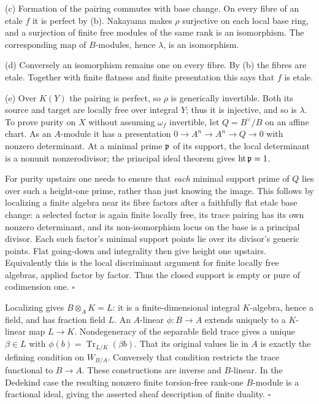 \documentclass[11pt]{article}
\let\chapterexercise\exercise
\renewcommand{\exercise}[2]{\Needspace{8\baselineskip}\chapterexercise{#1}{#2}}
\begin{document}
(c) Formation of the pairing commutes with base change. On every fibre of an etale $f$ it is perfect by (b). Nakayama makes $\rho$ surjective on each local base ring, and a surjection of finite free modules of the same rank is an isomorphism. The corresponding map of $B$-modules, hence $\lambda$, is an isomorphism.

(d) Conversely an isomorphism remains one on every fibre. By (b) the fibres are etale. Together with finite flatness and finite presentation this says that $f$ is etale.

(e) Over $K(Y)$ the pairing is perfect, so $\rho$ is generically invertible. Both its source and target are locally free over integral $Y$; thus it is injective, and so is $\lambda$. To prove purity on $X$ without assuming $\omega_f$ invertible, let $Q=B^\vee/B$ on an affine chart. As an $A$-module it has a presentation $0\to A^n\to A^n\to Q\to0$ with nonzero determinant. At a minimal prime $\mathfrak p$ of its support, the local determinant is a nonunit nonzerodivisor; the principal ideal theorem gives $\operatorname{ht}\mathfrak p=1$.

For purity upstairs one needs to ensure that \emph{each} minimal support prime of $Q$ lies over such a height-one prime, rather than just knowing the image. This follows by localizing a finite algebra near its fibre factors after a faithfully flat etale base change: a selected factor is again finite locally free, its trace pairing has its own nonzero determinant, and its non-isomorphism locus on the base is a principal divisor. Each such factor's minimal support points lie over its divisor's generic points. Flat going-down and integrality then give height one upstairs. Equivalently this is the local discriminant argument for finite locally free algebras, applied factor by factor. Thus the closed support is empty or pure of codimension one. \hfill$\square$

\pf
Localizing gives $B\otimes_AK=L$: it is a finite-dimensional integral $K$-algebra, hence a field, and has fraction field $L$. An $A$-linear $\phi:B\to A$ extends uniquely to a $K$-linear map $L\to K$. Nondegeneracy of the separable field trace gives a unique $\beta\in L$ with $\phi(b)=\operatorname{Tr}_{L/K}(\beta b)$. That its original values lie in $A$ is exactly the defining condition on $W_{B/A}$. Conversely that condition restricts the trace functional to $B\to A$. These constructions are inverse and $B$-linear. In the Dedekind case the resulting nonzero finite torsion-free rank-one $B$-module is a fractional ideal, giving the asserted sheaf description of finite duality. \hfill$\square$
\end{document}
